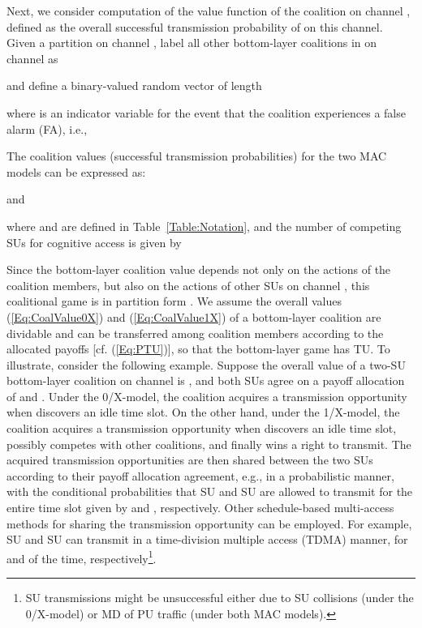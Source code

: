 \documentclass[journal,draftclsnofoot,onecolumn]{IEEEtran}
\theoremstyle{definition}
\newif\ifdoublecolumn
\begin{document}
Next, we consider computation of the value function  of the coalition  on channel , defined as the overall successful transmission probability of  on this channel. Given a partition  on channel , label all other bottom-layer coalitions in  on channel  as

and define a binary-valued random vector of length  

where  is an indicator variable for the event that the coalition  experiences a false alarm (FA), i.e.,

The coalition values (successful transmission probabilities) for the two MAC models can be expressed as:
\ifdoublecolumn

\else

\fi
and
\ifdoublecolumn

\else

\fi
where  and  are defined in Table~\ref{Table:Notation}, and the number of competing SUs for cognitive access is given by


Since the bottom-layer coalition value  depends not only on the actions of the coalition members, but also on the actions of other SUs on channel , this coalitional game is in partition form \cite{CoalGameSurvey}. We assume the overall values (\ref{Eq:CoalValue0X}) and (\ref{Eq:CoalValue1X}) of a bottom-layer coalition are dividable and can be transferred among coalition members according to the allocated payoffs  [cf. (\ref{Eq:PTU})], so that the bottom-layer game has TU. To illustrate, consider the following example. Suppose the overall value of a two-SU bottom-layer coalition  on channel  is , and both SUs agree on a payoff allocation of  and . Under the 0/X-model, the coalition  acquires a transmission opportunity when  discovers an idle time slot. On the other hand, under the 1/X-model, the coalition  acquires a transmission opportunity when  discovers an idle time slot, possibly competes with other coalitions, and finally wins a right to transmit. The acquired transmission opportunities are then shared between the two SUs according to their payoff allocation agreement, e.g., in a probabilistic manner, with the conditional probabilities that SU  and SU  are allowed to transmit for the entire time slot given by  and , respectively. Other schedule-based multi-access methods for sharing the transmission opportunity can be employed. For example, SU  and SU  can transmit in a time-division multiple access (TDMA) manner, for  and  of the time, respectively\footnote{SU transmissions might be unsuccessful either due to SU collisions (under the 0/X-model) or MD of PU traffic (under both MAC models).}. 
\end{document}

